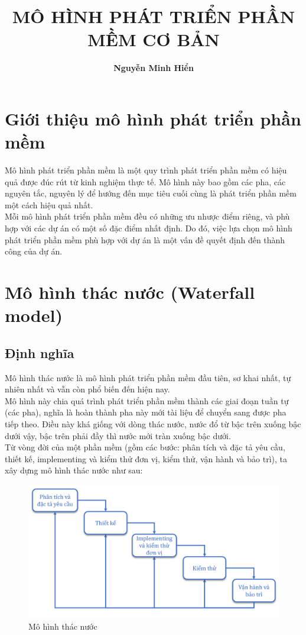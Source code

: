 \documentclass[14pt]{extarticle}
\title{\textbf{MÔ HÌNH PHÁT TRIỂN PHẦN MỀM CƠ BẢN}}
\author{\textbf{Nguyễn Minh Hiển}}
\begin{document}
\newpage
\maketitle
\tableofcontents
\newpage
\section*{Giới thiệu mô hình phát triển phần mềm}
Mô hình phát triển phần mềm là một quy trình phát triển
phần mềm có hiệu quả được đúc rút từ kinh nghiệm thực tế. Mô hình
này bao gồm các pha, các nguyên tắc, nguyên lý để hướng
đến mục tiêu cuối cùng là phát triển phần mềm một cách hiệu
quả nhất.\\

Mỗi mô hình phát triển phần mềm đều có những ưu nhược điểm
riêng, và phù hợp với các dự án có một số đặc điểm nhất định.
Do đó, việc lựa chọn mô hình phát triển phần mềm phù hợp với
dự án là một vấn đề quyết định đến thành công của dự án.
\newpage
\section{Mô hình thác nước (Waterfall model)}

\subsection{Định nghĩa}
Mô hình thác nước là mô hình phát triển phần mềm đầu tiên,
sơ khai nhất, tự nhiên nhất và vẫn còn phổ biến đến hiện nay.\\
Mô hình này chia quá trình phát triển phần mềm thành các giai đoạn
tuần tự (các pha), nghĩa là hoàn thành pha này mới tài liệu để
chuyển sang được pha tiếp theo.
Điều này khá giống với dòng thác nước, nước đổ từ bậc trên
xuống bậc dưới vậy, bậc trên phải đầy thì nước mới tràn xuống bậc dưới. \\
Từ vòng đời của một phần mềm (gồm các bước: phân tích và đặc tả yêu cầu,
thiết kế, implementing và kiểm thử đơn vị, kiểm thử, vận hành và
bảo trì), ta xây dựng mô hình thác nước như sau:
\begin{figure}[h]
  \centering
  \includegraphics[width=\textwidth]{waterfall2.png}
  \caption{Mô hình thác nước}
  \label{fig:waterfall}
\end{figure}
\end{document}
